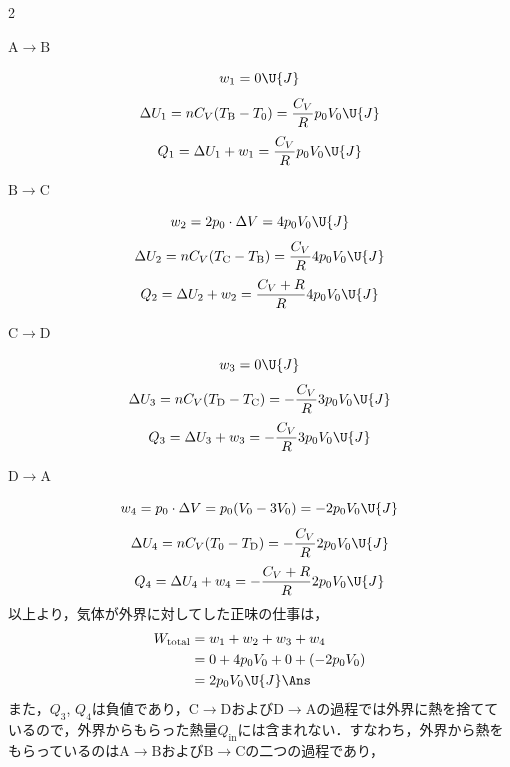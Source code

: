 \begin{multicols}{2}
\begin{komon}
\begin{list}{}{\setlength{\leftmargin}{1.2zw}\setlength{\itemsep}{0.3mm}\setlength{\topsep}{0.8mm}\setlength{\parsep}{0pt}}
       \item[・] $\mathrm{A}\rightarrow\mathrm{B}$
       \end{list}
       \[w_1=0\U{J}\]
       \[\Delta U_1=nC_V(T_{\mathrm{B}}-T_0)=\frac{C_V}{R}p_0V_0\U{J}\]
       \[Q_1=\Delta U_1+w_1=\frac{C_V}{R}p_0V_0\U{J}\]
       \begin{list}{}{\setlength{\leftmargin}{1.2zw}\setlength{\itemsep}{0.3mm}\setlength{\topsep}{0.8mm}\setlength{\parsep}{0pt}}
       \item[・] $\mathrm{B}\rightarrow\mathrm{C}$
       \end{list}
       \[w_2=2p_0\cdot\Delta V=4p_0V_0\U{J}\]
       \[\Delta U_2=nC_V(T_{\mathrm{C}}-T_{\mathrm{B}})=\frac{C_V}{R}4p_0V_0\U{J}\]
       \[Q_2=\Delta U_2+w_2=\frac{C_V+R}{R}4p_0V_0\U{J}\]
       \begin{list}{}{\setlength{\leftmargin}{1.2zw}\setlength{\itemsep}{0.3mm}\setlength{\topsep}{0.8mm}\setlength{\parsep}{0pt}}
       \item[・] $\mathrm{C}\rightarrow\mathrm{D}$
       \end{list}
       \[w_3=0\U{J}\]
       \[\Delta U_3=nC_V(T_{\mathrm{D}}-T_{\mathrm{C}})=-\frac{C_V}{R}3p_0V_0\U{J}\]
       \[Q_3=\Delta U_3+w_3=-\frac{C_V}{R}3p_0V_0\U{J}\]
       \begin{list}{}{\setlength{\leftmargin}{1.2zw}\setlength{\itemsep}{0.3mm}\setlength{\topsep}{0.8mm}\setlength{\parsep}{0pt}}
       \item[・] $\mathrm{D}\rightarrow\mathrm{A}$
       \end{list}
       \[w_4=p_0\cdot\Delta V=p_0(V_0-3V_0)=-2p_0V_0\U{J}\]
       \[\Delta U_4=nC_V(T_0-T_{\mathrm{D}})=-\frac{C_V}{R}2p_0V_0\U{J}\]
       \[Q_4=\Delta U_4+w_4=-\frac{C_V+R}{R}2p_0V_0\U{J}\]
       以上より，気体が外界に対してした正味の仕事は，
       \[\begin{aligned}
         W_{\mathrm{total}}&=w_1+w_2+w_3+w_4\\
          &=0+4p_0V_0+0+(-2p_0V_0)\\
          &=2p_0V_0\U{J}\Ans
       \end{aligned}\]
       また，$Q_3$, $Q_4$は負値であり，$\mathrm{C}\rightarrow\mathrm{D}$および$\mathrm{D}\rightarrow\mathrm{A}$の過程では外界に熱を捨てているので，外界からもらった熱量$Q_{\mathrm{in}}$には含まれない．すなわち，外界から熱をもらっているのは$\mathrm{A}\rightarrow\mathrm{B}$および$\mathrm{B}\rightarrow\mathrm{C}$の二つの過程であり，

\end{komon}
\end{multicols}
